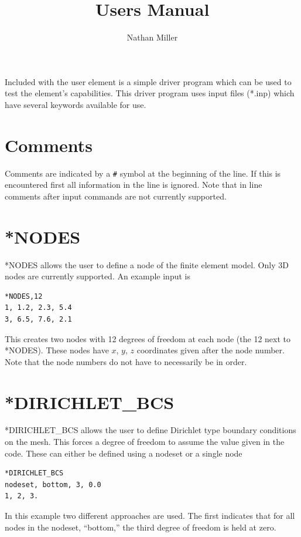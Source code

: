 \documentclass{asme2ej}
\begin{document}
\title{Users Manual}
\author{Nathan Miller}

\maketitle

Included with the user element is a simple driver program which can be used to test the element's capabilities. This driver program uses input files (*.inp) which have several keywords available for use.

\section{Comments}

Comments are indicated by a \verb|#| symbol at the beginning of the line. If this is encountered first all information in the line is ignored. Note that in line comments after input commands are not currently supported.

\section{*NODES}

*NODES allows the user to define a node of the finite element model. Only 3D nodes are currently supported. An example input is

\begin{verbatim}
*NODES,12
1, 1.2, 2.3, 5.4
3, 6.5, 7.6, 2.1
\end{verbatim}

This creates two nodes with 12 degrees of freedom at each node (the 12 next to *NODES). These nodes have $x$, $y$, $z$ coordinates given after the node number. Note that the node numbers do not have to necessarily be in order.

\section{*DIRICHLET\_BCS}

*DIRICHLET\_BCS allows the user to define Dirichlet type boundary conditions on the mesh. This forces a degree of freedom to assume the value given in the code. These can either be defined using a nodeset or a single node

\begin{verbatim}
*DIRICHLET_BCS
nodeset, bottom, 3, 0.0
1, 2, 3.
\end{verbatim}

In this example two different approaches are used. The first indicates that for all nodes in the nodeset, ``bottom,'' the third degree of freedom is held at zero.
\end{document}

